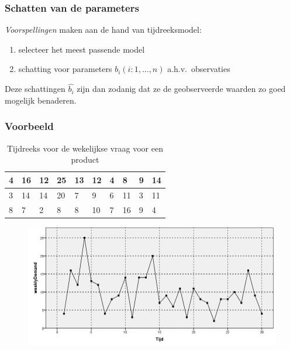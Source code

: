 \documentclass{beamer}
\begin{document}
\begin{frame}
  \frametitle{Schatten van de parameters}

  \emph{Voorspellingen} maken aan de hand van tijdreeksmodel:

  \begin{enumerate}
    \item selecteer het meest passende model
    \item schatting voor parameters $b_i (i: 1, \dots, n)$ a.h.v.~observaties
  \end{enumerate}

  Deze schattingen $\widehat{b_i}$ zijn dan zodanig dat ze de geobserveerde waarden zo goed mogelijk benaderen.
\end{frame}

\begin{frame}
  \frametitle{Voorbeeld}

  \begin{table}[t]
    \centering
    \begin{tabular}{|l|l|l|l|l|l|l|l|l|l|}
      \hline
      4 & 16 & 12 & 25 & 13 & 12 & 4 & 8  & 9 & 14 \\ \hline
      3 & 14 & 14 & 20 & 7  & 9  & 6 & 11 & 3 & 11 \\ \hline
      8 & 7  & 2  & 8  & 8  & 10 & 7 & 16 & 9 & 4  \\ \hline
    \end{tabular}
    \label{tab:data}
    \caption{Tijdreeks voor de wekelijkse vraag voor een product}
  \end{table}

  \begin{figure}
    \centering
    \includegraphics[width=.7\textwidth]{img/tijdreeks11}
  \end{figure}
\end{frame}
\end{document}

